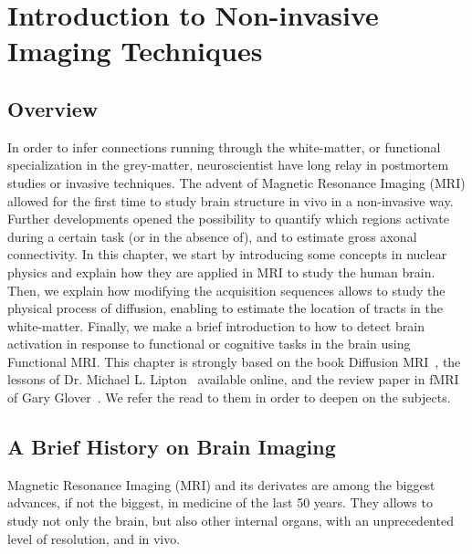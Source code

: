 \chapter{Introduction to Non-invasive Imaging Techniques}
\label{ch:intro_mri}

\section{Overview}
In order to infer connections running through the white-matter, or functional
specialization in the grey-matter, neuroscientist have long relay in postmortem
studies or invasive techniques. The advent of Magnetic Resonance Imaging (MRI)
allowed for the first time to study brain structure in vivo in a non-invasive
way. Further developments opened the possibility to quantify which regions
activate during a certain task (or in the absence of), and to estimate gross
axonal connectivity. In this chapter, we start by introducing some concepts in
nuclear physics and explain how they are applied in MRI to study the human
brain. Then, we explain how modifying the acquisition sequences allows to
study the physical process of diffusion, enabling to estimate the location
of tracts in the white-matter. Finally, we make a brief introduction to how to
detect brain activation in response to functional or cognitive tasks in the
brain using Functional MRI. This chapter is strongly based on the book
Diffusion MRI~\cite{Basser2009}, the lessons of Dr. Michael L. 
Lipton~\cite{Lipton2014} available online, and the review paper in fMRI of 
Gary Glover~\cite{Glover2011}. We refer the read to them in order to deepen on
the subjects.

\section{A Brief History on Brain Imaging}

Magnetic Resonance Imaging (MRI) and its derivates are among the biggest advances,
if not the biggest, in medicine of the last 50 years. They allows to study not
only the brain, but also other internal organs, with an unprecedented level of
resolution, and in vivo. 

